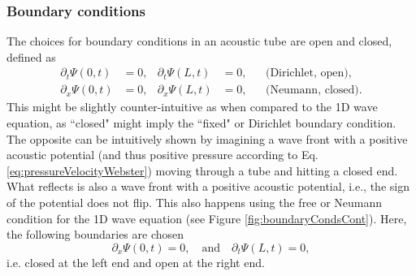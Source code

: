 
\subsubsection{Boundary conditions}
The choices for boundary conditions in an acoustic tube are open and closed, defined as \cite{Bilbao2018}
\begin{subequations}\label{eq:contBoundariesBrass}
    \begin{align}
        \partial_t\Psi(0, t) &= 0, & \partial_t\Psi(L, t) &= 0, & &\text{(Dirichlet, open)},\label{eq:contDirichletBrass}\\
        \partial_x\Psi(0, t) &= 0, & \partial_x\Psi(L, t) &= 0, & &\text{(Neumann, closed)}\label{eq:contNeumannBrass}.
    \end{align}
\end{subequations}
This might be slightly counter-intuitive as when compared to the 1D wave equation, as ``closed" might imply the ``fixed" or Dirichlet boundary condition. The opposite can be intuitively shown by imagining a wave front with a positive acoustic potential (and thus positive pressure according to Eq. \eqref{eq:pressureVelocityWebster}) moving through a tube and hitting a closed end. What reflects is also a wave front with a positive acoustic potential, i.e., the sign of the potential does not flip. This also happens using the free or Neumann condition for the 1D wave equation (see Figure \ref{fig:boundaryCondsCont}).
Here, the following boundaries are chosen
\begin{equation}\label{eq:openClosed}
    \partial_x\Psi(0, t) = 0, \quad \text{and} \quad \partial_t\Psi(L, t) = 0,
\end{equation}
i.e. closed at the left end and open at the right end.

